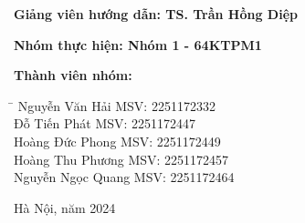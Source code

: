 \begin{titlepage}
    \vspace{-1.5cm}
    
    \begin{flushleft}
        \textbf{Giảng viên hướng dẫn: TS. Trần Hồng Diệp}
    \end{flushleft}
    
    \begin{flushleft}
        \textbf{Nhóm thực hiện: Nhóm 1 - 64KTPM1}
    \end{flushleft}
    
    \begin{flushleft}
        \textbf{Thành viên nhóm:}
    \end{flushleft}
    
    \begin{flushleft}
        \begin{tabbing}
            \hspace{4cm}\= \hspace{8cm} \kill
            Nguyễn Văn Hải\> MSV: 2251172332\\
            Đỗ Tiến Phát\> MSV: 2251172447\\
            Hoàng Đức Phong\> MSV: 2251172449\\
            Hoàng Thu Phương\> MSV: 2251172457\\
            Nguyễn Ngọc Quang\> MSV: 2251172464\\
        \end{tabbing}
    \end{flushleft}
    
    \begin{center}
        \vspace*{\fill}
        Hà Nội, năm 2024
        \vspace*{\fill}
    \end{center}
\end{titlepage}


